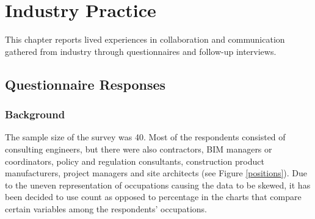 \chapter{Industry Practice} %

\label{Chapter9} %



    
This chapter reports lived experiences in collaboration and communication gathered from industry through questionnaires and follow-up interviews.



\section{Questionnaire Responses}




\subsection{Background}

The sample size of the survey was 40.
Most of the respondents consisted of consulting engineers, but there were also contractors, BIM managers or coordinators, policy and regulation consultants, construction product manufacturers, project managers and site architects (see Figure \ref{positions}).
Due to the uneven representation of occupations causing the data to be skewed, it has been decided to use count as opposed to percentage in the charts that compare certain variables among the respondents' occupations.

